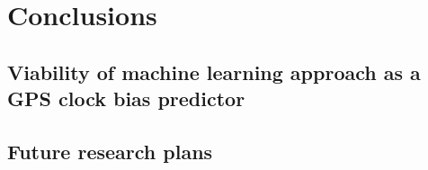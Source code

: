 
\chapter{Conclusions}

\section{Viability of machine learning approach as a GPS clock bias predictor}

\section{Future research plans}

